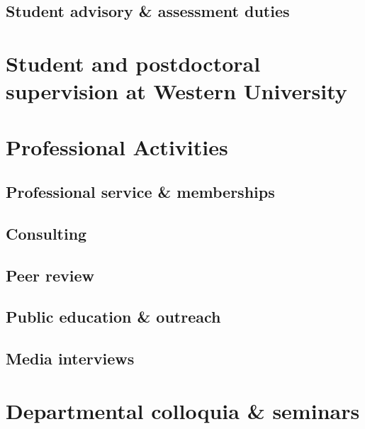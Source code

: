 \documentclass[12pt]{article}
\begin{document}
\vspace{0.5cm}
\subsection{Student advisory \& assessment duties}


\section{Student and postdoctoral supervision at Western University}




\section{Professional Activities}



\subsection{Professional service \& memberships}


\vspace{0.8cm}
\subsection{Consulting}


\subsection{Peer review}


\subsection{Public education \& outreach}


\vspace{0.8cm}
\subsection{Media interviews}


\clearpage
\section{Departmental colloquia \& seminars}


\clearpage

\begin{publications}

\printbibliography[title={Submitted refereed publications},keyword=submit]

\printbibliography[title={Refereed publications},keyword=ref]

\setcounter{papers}{0}
\printbibliography[title={Conference presentations},keyword=unref]


\end{publications}
\end{document}
